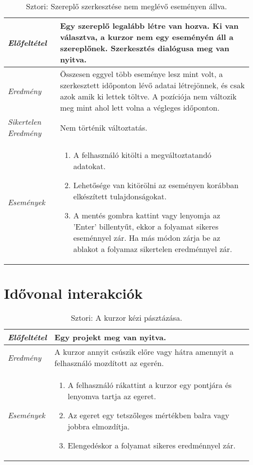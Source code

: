 \begin{table}[H]
	\centering
	\begin{tabular}{ | m{} | m{} | }
		\hline
		\emph{Előfeltétel} & Egy szereplő legalább létre van hozva. Ki van választva, a kurzor nem egy eseményén áll a szereplőnek. Szerkesztés dialógusa meg van nyitva. \\
		\hline
		\emph{Eredmény} & Összesen eggyel több eseménye lesz mint volt, a szerkesztett időponton lévő adatai létrejönnek, és csak azok amik ki lettek töltve. A pozíciója nem változik meg mint ahol lett volna a végleges időponton. \\
		\hline
		\emph{Sikertelen Eredmény} & Nem történik változtatás.  \\
		\hline
		\hline
		\emph{Események} &

		\begin{enumerate}[itemsep=-1ex]
			\item A felhasználó kitölti a megváltoztatandó adatokat.
			\item Lehetősége van kitörölni az eseményen korábban elkészített tulajdonságokat.
			\item A mentés gombra kattint vagy lenyomja az 'Enter' billentyűt, ekkor a folyamat sikeres eseménnyel zár. Ha más módon zárja be az ablakot a folyamaz sikertelen eredménnyel zár.
		\end{enumerate}
		\\
		\hline
	\end{tabular}
	\caption{Sztori: Szereplő szerkesztése nem meglévő eseményen állva.}
	\label{tab:story-actor-edit-not-on-event}
\end{table}




\section{Idővonal interakciók}

\begin{table}[H]
	\centering
	\begin{tabular}{ | m{} | m{} | }
		\hline
		\emph{Előfeltétel} & Egy projekt meg van nyitva. \\
		\hline
		\emph{Eredmény} & A kurzor annyit csúszik előre vagy hátra amennyit a felhasználó mozdított az egerén. \\
		\hline
		\hline
		\emph{Események} &
		\begin{enumerate}[itemsep=-1ex]
			\item A felhasználó rákattint a kurzor egy pontjára és lenyomva tartja az egeret.
			\item Az egeret egy tetszőleges mértékben balra vagy jobbra elmozdítja.
			\item Elengedéskor a folyamat sikeres eredménnyel zár.
		\end{enumerate}
		\\
		\hline
	\end{tabular}
	\caption{Sztori: A kurzor kézi pásztázása.}
	\label{tab:story-timeline-manual-pan-cursor}
\end{table}


